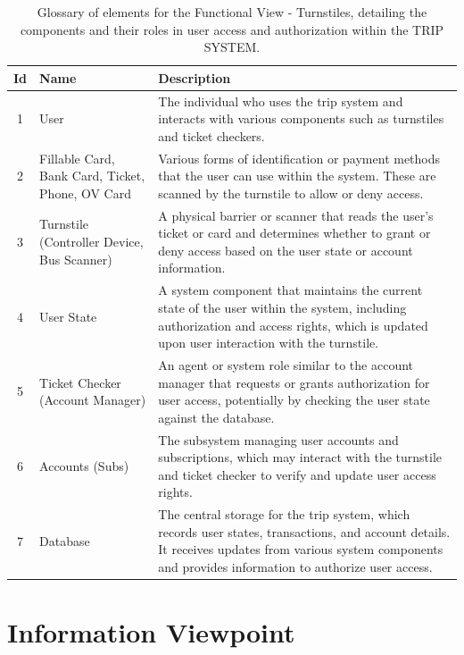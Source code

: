 \begin{table}[H] %
    \centering
    \begin{tabular}{@{}clp{9cm}@{}} %
    \toprule
    \textbf{Id} & \textbf{Name} & \textbf{Description} \\
    \midrule
    1 & User & The individual who uses the trip system and interacts with various components such as turnstiles and ticket checkers. \\
    2 & Fillable Card, Bank Card, Ticket, Phone, OV Card & Various forms of identification or payment methods that the user can use within the system. These are scanned by the turnstile to allow or deny access. \\
    3 & Turnstile (Controller Device, Bus Scanner) & A physical barrier or scanner that reads the user's ticket or card and determines whether to grant or deny access based on the user state or account information. \\
    4 & User State & A system component that maintains the current state of the user within the system, including authorization and access rights, which is updated upon user interaction with the turnstile. \\
    5 & Ticket Checker (Account Manager) & An agent or system role similar to the account manager that requests or grants authorization for user access, potentially by checking the user state against the database. \\
    6 & Accounts (Subs) & The subsystem managing user accounts and subscriptions, which may interact with the turnstile and ticket checker to verify and update user access rights. \\
    7 & Database & The central storage for the trip system, which records user states, transactions, and account details. It receives updates from various system components and provides information to authorize user access. \\
    \bottomrule
    \end{tabular}
    \caption{Glossary of elements for the Functional View - Turnstiles, detailing the components and their roles in user access and authorization within the TRIP SYSTEM.}
    \label{tab:glossary_turnstiles}
\end{table}

\section*{Information Viewpoint}


